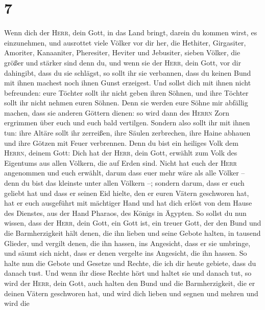 \hypertarget{section-6}{%
\section{7}\label{section-6}}

 Wenn dich der \textsc{Herr}, dein Gott, in das Land
bringt, darein du kommen wirst, es einzunehmen, und ausrottet viele
Völker vor dir her, die Hethiter, Girgasiter, Amoriter, Kanaaniter,
Pheresiter, Heviter und Jebusiter, sieben Völker, die größer und stärker
sind denn du,  und wenn sie der \textsc{Herr}, dein Gott,
vor dir dahingibt, dass du sie schlägst, so sollt ihr sie verbannen,
dass du keinen Bund mit ihnen machest noch ihnen Gunst erzeigest.
 Und sollst dich mit ihnen nicht befreunden: eure Töchter
sollt ihr nicht geben ihren Söhnen, und ihre Töchter sollt ihr nicht
nehmen euren Söhnen.  Denn sie werden eure Söhne mir
abfällig machen, dass sie anderen Göttern dienen: so wird dann des
\textsc{Herrn} Zorn ergrimmen über euch und euch bald vertilgen.
 Sondern also sollt ihr mit ihnen tun: ihre Altäre sollt
ihr zerreißen, ihre Säulen zerbrechen, ihre Haine abhauen und ihre
Götzen mit Feuer verbrennen.  Denn du bist ein heiliges
Volk dem \textsc{Herrn}, deinem Gott: Dich hat der \textsc{Herr}, dein
Gott, erwählt zum Volk des Eigentums aus allen Völkern, die auf Erden
sind.  Nicht hat euch der \textsc{Herr} angenommen und
euch erwählt, darum dass euer mehr wäre als alle Völker -- denn du bist
das kleinste unter allen Völkern --;  sondern darum, dass
er euch geliebt hat und dass er seinen Eid hielte, den er euren Vätern
geschworen hat, hat er euch ausgeführt mit mächtiger Hand und hat dich
erlöst von dem Hause des Dienstes, aus der Hand Pharaos, des Königs in
Ägypten.  So sollst du nun wissen, dass der \textsc{Herr},
dein Gott, ein Gott ist, ein treuer Gott, der den Bund und die
Barmherzigkeit hält denen, die ihn lieben und seine Gebote halten, in
tausend Glieder,  und vergilt denen, die ihn hassen, ins
Angesicht, dass er sie umbringe, und säumt sich nicht, dass er denen
vergelte ins Angesicht, die ihn hassen.  So halte nun die
Gebote und Gesetze und Rechte, die ich dir heute gebiete, dass du danach
tust.  Und wenn ihr diese Rechte hört und haltet sie und
danach tut, so wird der \textsc{Herr}, dein Gott, auch halten den Bund
und die Barmherzigkeit, die er deinen Vätern geschworen hat,
 und wird dich lieben und segnen und mehren und wird die
